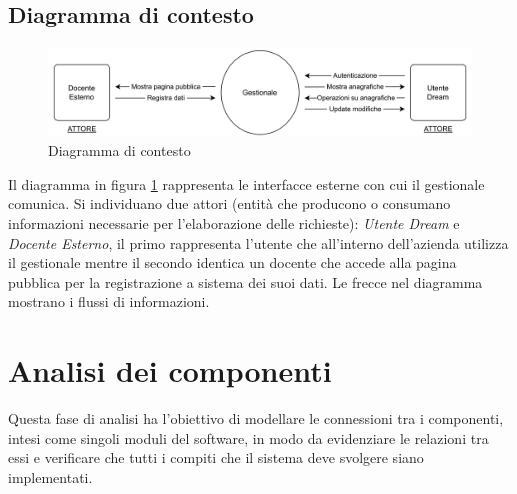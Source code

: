 \subsection{Diagramma di contesto}
\begin{figure}[h]
\centering
\includegraphics[scale=0.8]{img/Diagramma di Contesto.jpg}
\caption{Diagramma di contesto}
\label{fig:Diagrammadicontesto}
\end{figure}
\noindent
Il diagramma in figura \ref{fig:Diagrammadicontesto} rappresenta le interfacce esterne con cui il gestionale comunica. Si individuano due attori (entità che producono o consumano informazioni necessarie per l’elaborazione delle richieste): \textit{Utente Dream} e \textit{Docente Esterno}, il primo rappresenta l'utente che all'interno dell'azienda utilizza il gestionale mentre il secondo identica un docente che accede alla pagina pubblica per la registrazione a sistema dei suoi dati. Le frecce nel diagramma mostrano i flussi di informazioni.

\section{Analisi dei componenti}
\label{sec:componenti}
Questa fase di analisi ha l'obiettivo di modellare le connessioni tra i componenti, intesi come singoli moduli del software, in modo da evidenziare le relazioni tra essi e verificare che tutti i compiti che il sistema deve svolgere siano implementati. 

